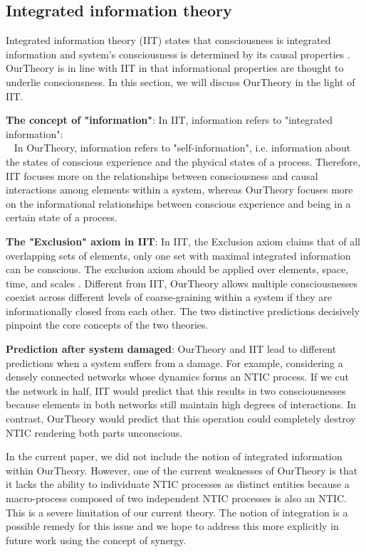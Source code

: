 \documentclass[utf8]{article}
\begin{document}
		\subsection{Integrated information theory}
            Integrated information theory (IIT) states that consciousness is integrated information and system's consciousness is determined by its causal properties \citep{tononi2016integrated}. \ac{OurTheory} is in line with IIT in that informational properties are thought to underlie consciousness. In this section, we will discuss \ac{OurTheory} in the light of IIT. 
            
            \textbf{The concept of "information"}: In IIT, information refers to "integrated information":\\ ~\citep{tononi2016integrated} In \ac{OurTheory}, information refers to "self-information", i.e. information about the states of conscious experience and the physical states of a process. Therefore, IIT focuses more on the relationships between consciousness and causal interactions among elements within a system, whereas \ac{OurTheory} focuses more on the informational relationships between conscious experience and being in a certain state of a process. 
		    
		    \textbf{The "Exclusion" axiom in IIT}: In IIT, the Exclusion axiom claims that of all overlapping sets of elements, only one set with maximal integrated information can be conscious. The exclusion axiom should be applied over elements, space, time, and scales \citep{oizumi2014phenomenology, hoel2016can}. Different from IIT, \ac{OurTheory} allows multiple consciousnesses coexist across different levels of coarse-graining within a system if they are informationally closed from each other. The two distinctive predictions decisively pinpoint the core concepts of the two theories. 
		    
		    \textbf{Prediction after system damaged}: \ac{OurTheory} and IIT lead to different predictions when a system suffers from a damage. For example, considering a densely connected networks whose dynamics forms an NTIC process. If we cut the network in half, IIT would predict that this results in two consciousnesses because elements in both networks still maintain high degrees of interactions. In contrast, \ac{OurTheory} would predict that this operation could completely destroy NTIC rendering both parts unconscious.
		    
		    In the current paper, we did not include the notion of integrated information within \ac{OurTheory}. However, one of the current weaknesses of \ac{OurTheory} is that it lacks the ability to individuate NTIC processes as distinct entities because a macro-process composed of two independent NTIC processes is also an NTIC. This is a severe limitation of our current theory.  The notion of integration is a possible remedy for this issue and we hope to address this more explicitly in future work using the concept of synergy. 
		    
\end{document}
